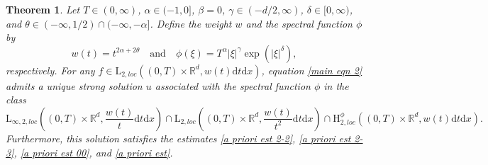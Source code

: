 \documentclass[11pt,reqno]{amsart}
\newtheorem{thm}{Theorem}[section]
\theoremstyle{definition}
\theoremstyle{remark}
\newcommand\bR{\mathbb{R}}
\numberwithin{equation}{section}
\begin{document}
\begin{thm}
									\label{main appl 3}
Let $T \in (0,\infty)$, $\alpha\in (-1,0]$, $\beta=0$, $\gamma \in (-d/2,\infty)$, $\delta \in [0,\infty)$, and $\theta \in  (-\infty, 1/2) \cap (-\infty,-\alpha]$. 
Define the weight $w$ and the spectral function $\phi$ by
$$
w(t)=t^{2\alpha+2\theta}  \quad \text{and} \quad \phi(\xi)= T^\alpha |\xi|^{\gamma} \exp\left( |\xi|^{\delta} \right),
$$
respectively. 
For any $f \in \mathrm{L}_{2,loc}\left( (0,T) \times \bR^d, w(t)\mathrm{d}t\mathrm{d}x \right)$, equation \eqref{main eqn 2} admits a unique strong solution $u$ associated with the spectral function $\phi$ in the class
$$
\mathrm{L}_{\infty,2, loc}\left( (0,T) \times \bR^d ,\frac{w(t)}{t}\mathrm{d}t \mathrm{d}x\right) \cap \mathrm{L}_{2, loc}\left( (0,T) \times \bR^d,\frac{w(t)}{t^2}\mathrm{d}t\mathrm{d}x \right) \cap \mathrm{H}_{2,loc}^{\phi}\left( (0,T) \times \bR^d, w(t)\mathrm{d}t\mathrm{d}x \right).
$$
Furthermore, this solution satisfies the estimates \eqref{a priori est 2-2}, \eqref{a priori est 2-3}, \eqref{a priori est 00}, and \eqref{a priori est}.
\end{thm}
\end{document}

